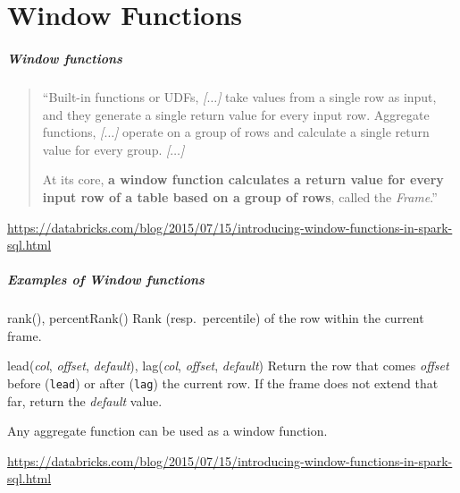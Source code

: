 \documentclass[english,serif,mathserif]{beamer}
\begin{document}
\part{Window Functions}

\begin{frame}
  \frametitle{Window functions}

  \begin{quotation}
    ``Built-in functions or UDFs, \emph{[$\ldots$]} take values from a single
    row as input, and they generate a single return value for every input row.
    Aggregate functions, \emph{[$\ldots$]} operate on a group of rows and
    calculate a single return value for every group. \emph{[$\ldots$]}

    \+ At its core, \textbf{a window function calculates a return value for
      every input row of a table based on a group of rows}, called the
    \emph{Frame}.''
  \end{quotation}

  \+
  \begin{references}
    \url{https://databricks.com/blog/2015/07/15/introducing-window-functions-in-spark-sql.html}
  \end{references}
\end{frame}

\begin{frame}
  \frametitle{Examples of Window functions}

  \begin{describe}{rank(), percentRank()}
    Rank (resp.~percentile) of the row within the current frame.
  \end{describe}

  \+
  \begin{describe}{lead(\emph{col}, \emph{offset}, \emph{default}),
      lag(\emph{col}, \emph{offset}, \emph{default})}
    Return the row that comes {\ttfamily\em offset} before (\texttt{lead}) or after
    (\texttt{lag}) the current row.  If the frame does not extend that far,
    return the {\ttfamily\em default} value.
  \end{describe}

  \+
  Any aggregate function can be used as a window function.

  \+
  \begin{references}
    \url{https://databricks.com/blog/2015/07/15/introducing-window-functions-in-spark-sql.html}
  \end{references}
\end{frame}
\end{document}
